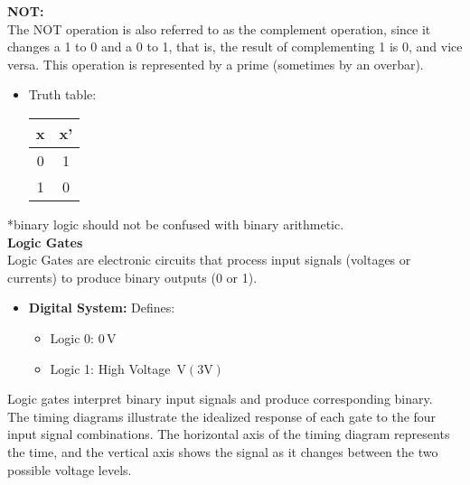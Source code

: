 \documentclass{article}
\begin{document}
\textbf{NOT:}\\[10pt]
The NOT operation is also referred to as the complement operation, since it changes a 1 to 0 and a 0 to 1, that is, the result of complementing 1 is 0, and vice versa. This operation is represented by a prime (sometimes by an overbar).
\begin{itemize}
        \item Truth table:
        \begin{tabular}{|c|c|}
        \hline
        x & x' \\
        \hline
        0 & 1 \\
        \hline
        1 & 0 \\
        \hline
        \end{tabular}
\end{itemize}
*binary logic should not be confused with binary arithmetic.\\[10pt]
\textbf{Logic Gates}\\[10pt]
Logic Gates are electronic circuits that process input signals (voltages or currents) to produce binary outputs (0 or 1).
\begin{itemize}
    \item \textbf{Digital System:} Defines:
    \begin{itemize}
        \item Logic 0: $0 \, \text{V}$
        \item Logic 1: High Voltage $ \, \text{V}(3 \text{V})$
    \end{itemize}
\end{itemize}
Logic gates interpret binary input signals and produce corresponding binary. \\
The timing diagrams illustrate the idealized response of each gate to the
four input signal combinations. The horizontal axis of the timing diagram represents the time, and the vertical axis shows the signal as it changes between the two possible
voltage levels.\\
\end{document}
